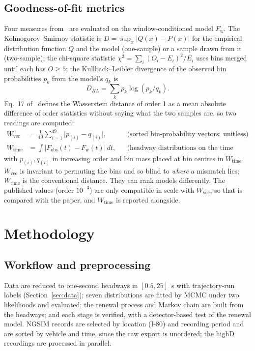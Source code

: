 \documentclass[10pt,a4paper]{article}
\numberwithin{equation}{section}
\newcommand{\Wvec}{W_{\mathrm{vec}}}
\newcommand{\Wtime}{W_{\mathrm{time}}}
\begin{document}
\subsection{Goodness-of-fit metrics}\label{sec:metrics}
Four measures from~\cite{leungbootnak} are evaluated on the window-conditioned model $F_{\mathrm w}$. The Kolmogorov--Smirnov statistic is $D=\sup_x|Q(x)-P(x)|$ for the empirical distribution function $Q$ and the model (one-sample) or a sample drawn from it (two-sample);
the chi-square statistic $\chi^2=\sum_i(O_i-E_i)^2/E_i$ uses bins merged until each has $O\ge5$; the Kullback--Leibler divergence of the observed bin probabilities $p_k$ from the model's $q_k$ is
\begin{equation}\label{eq:kl}
D_{KL}=\sum_kp_k\log(p_k/q_k).
\end{equation}
Eq.~17 of~\cite{leungbootnak} defines the Wasserstein distance of order 1 as a mean absolute difference of order statistics without saying what the two samples are, so two readings are computed:
\begin{align}
\Wvec&=\tfrac1{49}\textstyle\sum_{i=1}^{49}\big|p_{(i)}-q_{(i)}\big|, &&\text{(sorted bin-probability vectors; unitless)}\label{eq:wvec}\\
\Wtime&=\textstyle\int\big|F_{\mathrm{obs}}(t)-F_{\mathrm w}(t)\big|\,dt, &&\text{(headway distributions on the time axis; seconds)}\label{eq:wtime}
\end{align}
with $p_{(i)},q_{(i)}$ in increasing order and bin mass placed at bin centres in $\Wtime$. $\Wvec$ is invariant to permuting the bins and so blind to \emph{where} a mismatch lies; $\Wtime$ is the conventional distance. They can rank models differently. The published values (order $10^{-3}$) are only compatible in scale with $\Wvec$, so that is compared with the paper, and $\Wtime$ is reported alongside.

\section{Methodology}\label{sec:method}

\subsection{Workflow and preprocessing}
Data are reduced to one-second headways in $[0.5,25]$~s with trajectory-run labels (Section~\ref{sec:data}); seven distributions are fitted by MCMC under two likelihoods and evaluated; the renewal process and Markov chain are built from the headways; and each stage is verified, with a detector-based test of the renewal model.
NGSIM records are selected by location (I-80) and recording period and are sorted by vehicle and time, since the raw export is unordered; the highD recordings are processed in parallel.
\end{document}
